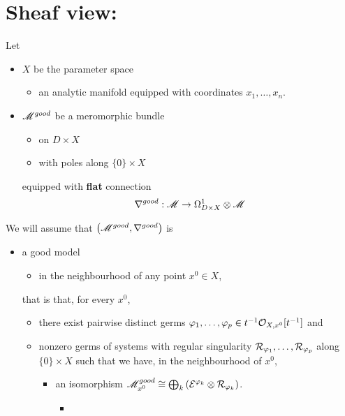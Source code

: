\section{Sheaf view: \cite{sabbah2007isomonodromic}} %
Let
\begin{itemize}
  \item $X$ be the \textcolor{green!40!black}{parameter space}
    \begin{itemize}
      \item an analytic manifold equipped with coordinates $x_1,\ldots,x_n$.
    \end{itemize}
  \item $\mathscr{M}^{good}$ be a meromorphic bundle
    \begin{itemize}
      \item on $D\times X$
      \item with poles along $\{0\}\times X$
    \end{itemize}
    equipped with \textbf{flat} connection
    \[
      \nabla^{good}:\mathscr{M}\to\Omega_{D\times X}^1\otimes\mathscr{M}
    \]
\end{itemize}
We will assume that $\left(\mathscr{M}^{good},\nabla^{good}\right)$ is
\begin{itemize}
  \item a good model
    \begin{itemize}
      \item in the neighbourhood of any point $x^0\in X$,
    \end{itemize}
    that is that, for every $x^0$,
    \begin{itemize}
      \item there exist pairwise distinct germs $\varphi_1,\dots,\varphi_p\in
        t^{-1}\mathcal{O}_{X,x^0}[t^{-1}]$ and
      \item nonzero germs of systems with regular singularity
        $\mathcal{R}_{\varphi_1},\dots,\mathcal{R}_{\varphi_p}$ along $\{0\}\times X$ such that
            we have, in the neighbourhood of $x^0$,
        \begin{itemize}
          \item an isomorphism $\mathscr{M}_{x^0}^{good}
            \cong\bigoplus_k\left(\mathcal{E}^{\varphi_k}\otimes\mathcal{R}_{\varphi_k}\right)$.
            \begin{itemize}
              \item {}
            \end{itemize}
        \end{itemize}
    \end{itemize}
\end{itemize}
\begin{comment}
  $k\neq l$ $\overset{\text{II.5.6}}{\Rightarrow{}}$ the order of the pole with
  respect to $t$ of $(\phi_k-\phi_l)(x,t)$ does not depend on $x$ in a
  neighbourhood of $x^0$.
\end{comment}

